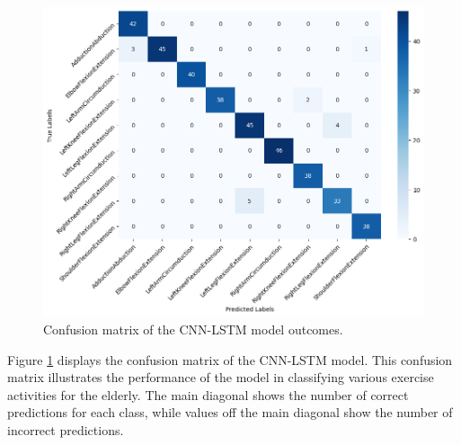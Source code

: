 
\begin{figure}[h!]
	\centering
	\includegraphics[width=1\textwidth]{bab4/ar_CNNLSTM_Confmatrix.png}
	\caption{Confusion matrix of the CNN-LSTM model outcomes.}
	\label{fig:CNNLSTM_Confmatrix}
\end{figure}

Figure \ref{fig:CNNLSTM_Confmatrix} displays the confusion matrix of the CNN-LSTM model. This confusion matrix illustrates the performance of the model in classifying various exercise activities for the elderly. The main diagonal shows the number of correct predictions for each class, while values off the main diagonal show the number of incorrect predictions.

